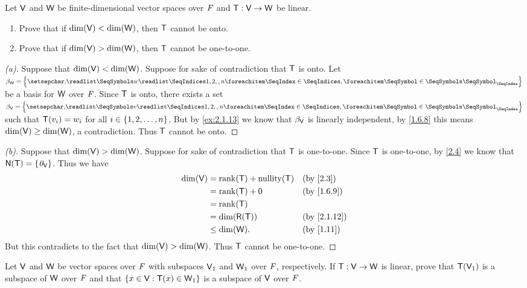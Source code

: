 \begin{ex}\label{ex:2.1.17}
	Let \(\mathsf{V}\) and \(\mathsf{W}\) be finite-dimensional vector spaces over \(\mathit{F}\) and \(\mathsf{T} : \mathsf{V} \to \mathsf{W}\) be linear.
	\begin{enumerate}
		\item Prove that if \(\dim(\mathsf{V}) < \dim(\mathsf{W})\), then \(\mathsf{T}\) cannot be onto.
		\item Prove that if \(\dim(\mathsf{V}) > \dim(\mathsf{W})\), then \(\mathsf{T}\) cannot be one-to-one.
	\end{enumerate}
\end{ex}

\begin{proof}[(a)]
	Suppose that \(\dim(\mathsf{V}) < \dim(\mathsf{W})\).
	Suppose for sake of contradiction that \(\mathsf{T}\) is onto.
	Let \(\beta_{\W} = \set{\seq{w}{1,2,,n}}\) be a basis for \(\mathsf{W}\) over \(\mathit{F}\).
	Since \(\mathsf{T}\) is onto, there exists a set \(\beta_{\V} = \set{\seq{v}{1,2,,n}}\) such that \(\mathsf{T}(v_i) = w_i\) for all \(i \in \left\lbrace1, 2, \dots, n\right\rbrace\).
	But by \cref{ex:2.1.13} we know that \(\beta_{\mathsf{V}}\) is linearly independent, by \cref{1.6.8} this means \(\dim(\mathsf{V}) \geq \dim(\mathsf{W})\), a contradiction.
	Thus \(\mathsf{T}\) cannot be onto.
\end{proof}

\begin{proof}[(b)]
	Suppose that \(\dim(\mathsf{V}) > \dim(\mathsf{W})\).
	Suppose for sake of contradiction that \(\mathsf{T}\) is one-to-one.
	Since \(\mathsf{T}\) is one-to-one, by \cref{2.4} we know that \(\ns{\T} = \set{\zv_{\V}}\).
	Thus we have
	\begin{align*}
		\dim(\V) & = \rk{\T} + \nt{\T} &  & \by{2.3}    \\
		         & = \rk{\T} + 0       &  & \by{1.6.9}  \\
		         & = \rk{\T}                            \\
		         & = \dim(\rg{\T})     &  & \by{2.1.12} \\
		         & \leq \dim(\W).      &  & \by{1.11}
	\end{align*}
	But this contradicts to the fact that \(\dim(\mathsf{V}) > \dim(\mathsf{W})\).
	Thus \(\mathsf{T}\) cannot be one-to-one.
\end{proof}

\setcounter{ex}{19}
\begin{ex}\label{ex:2.1.20}
	Let \(\mathsf{V}\) and \(\mathsf{W}\) be vector spaces over \(\mathit{F}\) with subspaces \(\mathsf{V}_1\) and \(\mathsf{W}_1\) over \(\mathit{F}\), respectively.
	If \(\mathsf{T} : \mathsf{V} \to \mathsf{W}\) is linear, prove that \(\mathsf{T}(\mathsf{V}_1)\) is a subspace of \(\mathsf{W}\) over \(\mathit{F}\) and that \(\left\lbrace x \in \mathsf{V} : \mathsf{T}(x) \in \mathsf{W}_1\right\rbrace\) is a subspace of \(\mathsf{V}\) over \(\mathit{F}\).
\end{ex}

